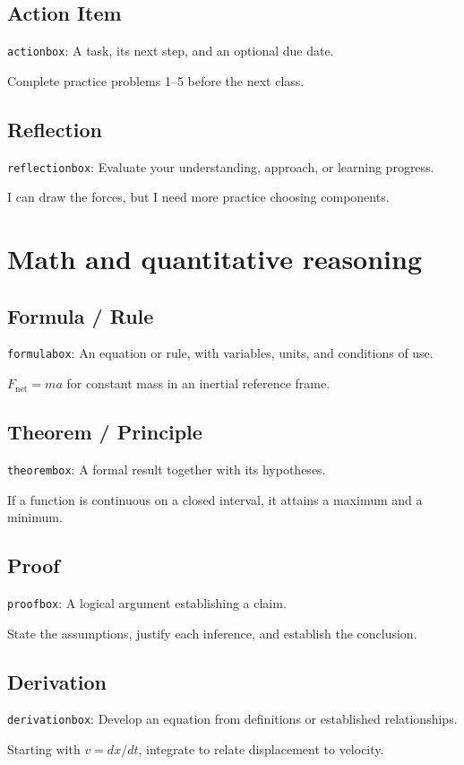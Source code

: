 \documentclass[11pt]{article}
\begin{document}
\subsection{Action Item}
{\small\texttt{actionbox}: A task, its next step, and an optional due date.}
\begin{actionbox}
Complete practice problems 1--5 before the next class.
\end{actionbox}
\subsection{Reflection}
{\small\texttt{reflectionbox}: Evaluate your understanding, approach, or learning progress.}
\begin{reflectionbox}
I can draw the forces, but I need more practice choosing components.
\end{reflectionbox}

\clearpage
\section{Math and quantitative reasoning}
\subsection{Formula / Rule}
{\small\texttt{formulabox}: An equation or rule, with variables, units, and conditions of use.}
\begin{formulabox}
$F_{\mathrm{net}}=ma$ for constant mass in an inertial reference frame.
\end{formulabox}
\subsection{Theorem / Principle}
{\small\texttt{theorembox}: A formal result together with its hypotheses.}
\begin{theorembox}
If a function is continuous on a closed interval, it attains a maximum and a minimum.
\end{theorembox}
\subsection{Proof}
{\small\texttt{proofbox}: A logical argument establishing a claim.}
\begin{proofbox}
State the assumptions, justify each inference, and establish the conclusion.
\end{proofbox}
\subsection{Derivation}
{\small\texttt{derivationbox}: Develop an equation from definitions or established relationships.}
\begin{derivationbox}
Starting with $v=dx/dt$, integrate to relate displacement to velocity.
\end{derivationbox}
\end{document}
